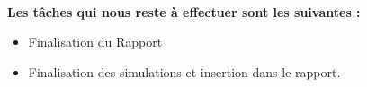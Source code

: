 \documentclass[a4paper]{article}
\begin{document}
~\\
{\bfseries Les tâches qui nous reste à effectuer sont les suivantes :}\\
\begin{itemize}\addtolength{\itemsep}{0.2cm}
\renewcommand\labelitemi{\textbullet}
	\item Finalisation du Rapport
	\item Finalisation des simulations et insertion dans le rapport.
\end{itemize}



\end{document}

